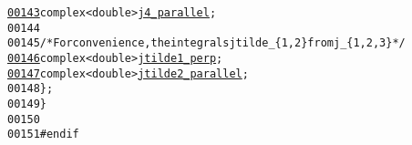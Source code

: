 \begin{footnotesize}
\begin{alltt}
\hypertarget{qcdf__integrals_8hh_source_l00143}{}\hyperlink{structeos_1_1QCDFIntegrals_1_1Results_aba4329760d20d62cec5824c940026f98}{00143}         complex<double> \hyperlink{structeos_1_1QCDFIntegrals_1_1Results_aba4329760d20d62cec5824c940026f98}{j4_parallel};
00144 
00145         \textcolor{comment}{/* For convenience, the integrals jtilde\_\{1,2\} from j\_\{1,2,3\} */}
\hypertarget{qcdf__integrals_8hh_source_l00146}{}\hyperlink{structeos_1_1QCDFIntegrals_1_1Results_affa81425a4a26725aec429cac18c363c}{00146}         complex<double> \hyperlink{structeos_1_1QCDFIntegrals_1_1Results_affa81425a4a26725aec429cac18c363c}{jtilde1_perp};
\hypertarget{qcdf__integrals_8hh_source_l00147}{}\hyperlink{structeos_1_1QCDFIntegrals_1_1Results_ae93c8c7a9f37dfc2f2a71bf76afc78fa}{00147}         complex<double> \hyperlink{structeos_1_1QCDFIntegrals_1_1Results_ae93c8c7a9f37dfc2f2a71bf76afc78fa}{jtilde2_parallel};
00148     \};
00149 \}
00150 
00151 \textcolor{preprocessor}{#endif}
\end{alltt}\end{footnotesize}
